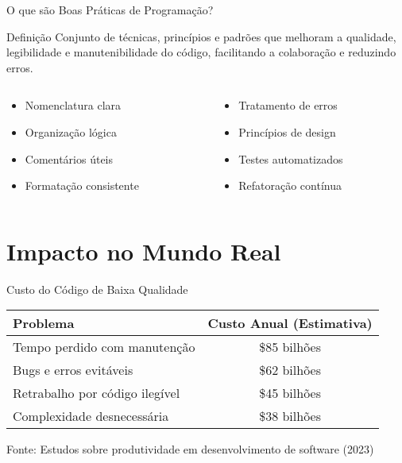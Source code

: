 \documentclass[10pt, aspectratio=169]{beamer}
\begin{document}
\begin{frame}{O que são Boas Práticas de Programação?}
\begin{block}{Definição}
Conjunto de técnicas, princípios e padrões que melhoram a qualidade, legibilidade e manutenibilidade do código, facilitando a colaboração e reduzindo erros.
\end{block}

\begin{columns}
\begin{column}{0.5\textwidth}
\begin{itemize}
    \item Nomenclatura clara
    \item Organização lógica
    \item Comentários úteis
    \item Formatação consistente
\end{itemize}
\end{column}
\begin{column}{0.5\textwidth}
\begin{itemize}
    \item Tratamento de erros
    \item Princípios de design
    \item Testes automatizados
    \item Refatoração contínua
\end{itemize}
\end{column}
\end{columns}
\end{frame}

\section{Impacto no Mundo Real}
\begin{frame}{Custo do Código de Baixa Qualidade}
\begin{table}
\centering
\begin{tabular}{lc}
\toprule
\textbf{Problema} & \textbf{Custo Anual (Estimativa)} \\
\midrule
Tempo perdido com manutenção & \$85 bilhões \\
Bugs e erros evitáveis & \$62 bilhões \\
Retrabalho por código ilegível & \$45 bilhões \\
Complexidade desnecessária & \$38 bilhões \\
\bottomrule
\end{tabular}
\end{table}
\vspace{0.5cm}
\footnotesize{Fonte: Estudos sobre produtividade em desenvolvimento de software (2023)}
\end{frame}
\end{document}
